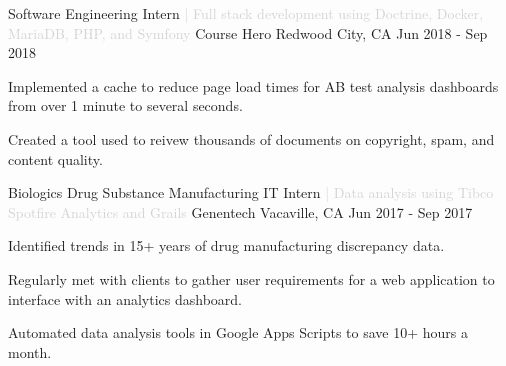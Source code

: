 

\begin{cventries}

  \cventry
  {Software Engineering Intern \textcolor{lightgray}{| Full stack development using Doctrine, Docker, MariaDB, PHP, and Symfony}}
  {Course Hero}
  {Redwood City, CA}
  {Jun 2018 - Sep 2018}
  {
  \begin{cvitems}
    \item {Implemented a cache to reduce page load times for AB test analysis dashboards from over 1 minute to several seconds.}
    \item {Created a tool used to reivew thousands of documents on copyright, spam, and content quality.}
  \end{cvitems}
  }

  \cventry
  {Biologics Drug Substance Manufacturing IT Intern \textcolor{lightgray}{| Data analysis using Tibco Spotfire Analytics and Grails} } %
  {Genentech} %
  {Vacaville, CA} %
  {Jun 2017 - Sep 2017} %
  {
  \begin{cvitems} %
    \item {Identified trends in 15+ years of drug manufacturing discrepancy data.}
    \item {Regularly met with clients to gather user requirements for a web application to interface with an analytics dashboard.}
    \item {Automated data analysis tools in Google Apps Scripts to save 10+ hours a month.}
  \end{cvitems}
  }
\end{cventries}

